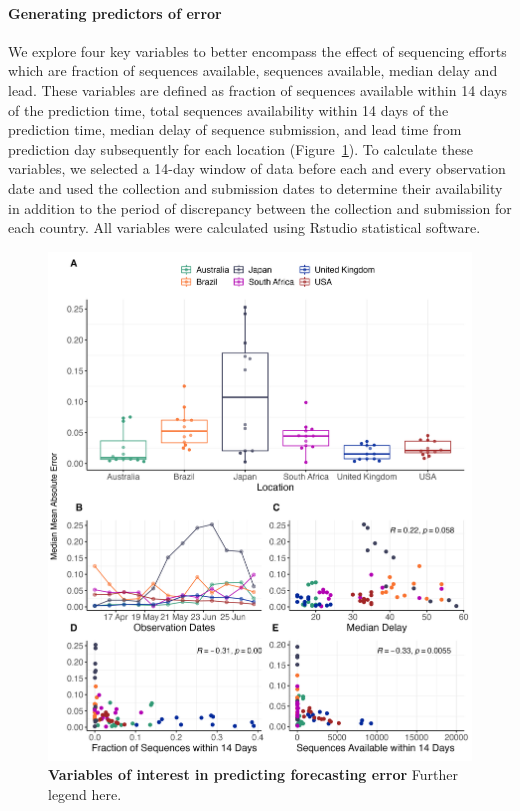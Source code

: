 \documentclass[11pt,oneside,letterpaper]{article}
\begin{document}
\paragraph{Generating predictors of error}

We explore four key variables to better encompass the effect of sequencing efforts which are fraction of sequences available, sequences available, median delay and lead. 
These variables are defined as fraction of sequences available within 14 days of the prediction time, total sequences availability within 14 days of the prediction time, median delay of sequence submission, and lead time from prediction day subsequently for each location (Figure~\ref{Figure 4}).
To calculate these variables, we selected a 14-day window of data before each and every observation date and used the collection and submission dates to determine their availability in addition to the period of discrepancy between the collection and submission for each country.
All variables were calculated using Rstudio statistical software.

\begin{figure}[H]
	\centering
    \includegraphics[width=1.1\textwidth]{figures/Var_of_interest.png}
	\caption{\textbf{Variables of interest in predicting forecasting error}
	Further legend here.
	}
	\label{Figure 4}
\end{figure}
\end{document}
